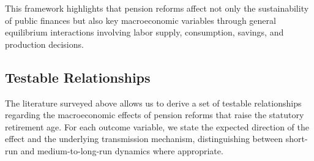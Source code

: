\documentclass[11pt,english,a4paper, twoside, authoryear]{article}
\begin{document}
This framework highlights that pension reforms affect not only the sustainability of public finances but also key macroeconomic variables through general equilibrium interactions involving labor supply, consumption, savings, and production decisions.

\subsection{Testable Relationships}

The literature surveyed above allows us to derive a set of testable relationships regarding the macroeconomic effects of pension reforms that raise the statutory retirement age. For each outcome variable, we state the expected direction of the effect and the underlying transmission mechanism, distinguishing between short-run and medium-to-long-run dynamics where appropriate.
\end{document}
